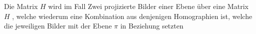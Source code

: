  
Die Matrix $H$ wird im Fall 
 Zwei projizierte Bilder einer Ebene über eine Matrix $H$ , welche wiederum eine Kombination aus denjenigen Homographien ist, welche die jeweiligen Bilder mit der Ebene $\pi$ in Beziehung setzten\cite{Elements}
% 
% 
% 
% 
% 
% 
% 
% 
% 
% 
% 
% 
% 
 
